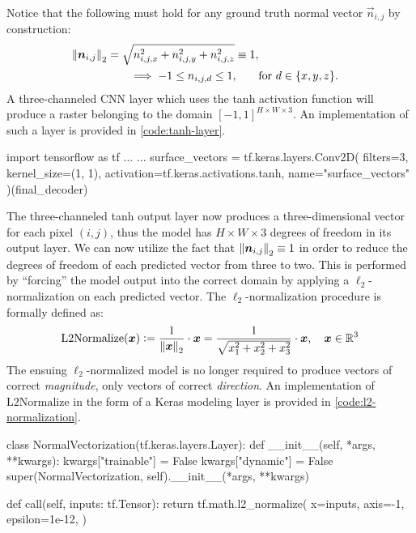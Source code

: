 Notice that the following must hold for any ground truth normal vector $\vec{n}_{i,j}$ by construction:
\begin{align*}
  \left\lVert\boldsymbol{n}_{i,j}\right\rVert_2 = \sqrt{n_{i,j,x}^2 + n_{i,j,y}^2 + n_{i,j,z}^2} \equiv 1, \\
  \implies -1 \leq n_{i,j,d} \leq 1, \qquad &\text{for } d \in \{x, y, z\}.
\end{align*}
%
A three-channeled CNN layer which uses the tanh activation function will produce a raster belonging to the domain $\left[-1, 1\right]^{H \times W \times 3}$.
An implementation of such a layer is provided in \cref{code:tanh-layer}.
\begin{listing}[H]
  \label{code:tanh-layer}
  \begin{pythoncode}
  import tensorflow as tf
  ...
  ...
  surface_vectors = tf.keras.layers.Conv2D(
      filters=3,
      kernel_size=(1, 1),
      activation=tf.keras.activations.tanh,
      name="surface_vectors"
  )(final_decoder)
  \end{pythoncode}
\end{listing}
\noindent
The three-channeled tanh output layer now produces a three-dimensional vector for each pixel $(i,j)$, thus the model has $H \times W \times 3$ degrees of freedom in its output layer.
We can now utilize the fact that $\left\lVert\boldsymbol{n}_{i,j}\right\rVert_2 \equiv 1$ in order to reduce the degrees of freedom of each predicted vector from three to two.
This is performed by \enquote{forcing} the model output into the correct domain by applying a $\ell_2$-normalization on each predicted vector.
The $\ell_2$-normalization procedure is formally defined as:
%
\begin{equation*}
  \mathrm{L2Normalize}(\boldsymbol{x})
  \vcentcolon=
  \frac{1}{\left\lVert\boldsymbol{x}\right\rVert_2} \cdot \boldsymbol{x}
  =
  \frac{1}{\sqrt{x_1^2 + x_2^2 + x_3^2}} \cdot \boldsymbol{x}
  ,\quad \boldsymbol{x} \in \mathbb{R}^3
\end{equation*}
%
The ensuing $\ell_2$-normalized model is no longer required to produce vectors of correct \emph{magnitude}, only vectors of correct \emph{direction}.
An implementation of $\mathrm{L2Normalize}$ in the form of a Keras modeling layer is provided in \cref{code:l2-normalization}.
\begin{listing}[H]
  \label{code:l2-normalization}
  \begin{pythoncode}
  class NormalVectorization(tf.keras.layers.Layer):
    def __init__(self, *args, **kwargs):
        kwargs["trainable"] = False
        kwargs["dynamic"] = False
        super(NormalVectorization, self).__init__(*args, **kwargs)

    def call(self, inputs: tf.Tensor):
        return tf.math.l2_normalize(
            x=inputs,
            axis=-1,
            epsilon=1e-12,
        )
  \end{pythoncode}
\end{listing}
